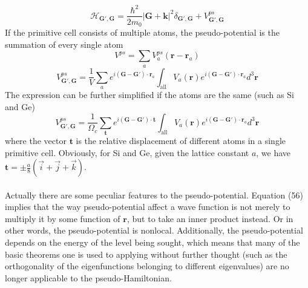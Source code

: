 \documentclass{article}
\begin{document}
\begin{equation}
   \mathcal{H}_{\mathbf{G}',\mathbf{G}}=\frac{\hbar^2}{2m_0}|\mathbf{G}+\mathbf{k}|^2\delta_{\mathbf{G}',\mathbf{G}}+V^{ps}_{\mathbf{G}',\mathbf{G}}
\end{equation}If the primitive cell consists of multiple atoms, the pseudo-potential is the summation of every single atom\begin{equation}
    V^{ps}=\sum_aV^{ps}_a(\mathbf{r}-\mathbf{r}_a)
\end{equation}\begin{equation}
    V^{ps}_{\mathbf{G}',\mathbf{G}}=\frac{1}{V}\sum_a{e^{i(\mathbf{G}-\mathbf{G}')\cdot\mathbf{r}_a}}\int_{\mathrm{all}}V_a(\mathbf{r})e^{i(\mathbf{G}-\mathbf{G}')\cdot\mathbf{r}_a}d^3\mathbf{r}
\end{equation}The expression can be further simplified if the atoms are the same (such as Si and Ge)\begin{equation}
    V^{ps}_{\mathbf{G}',\mathbf{G}}=\frac{1}{\Omega_c}\sum_{\mathbf{t}}{e^{i(\mathbf{G}-\mathbf{G}')\cdot\mathbf{t}}}\int_{\mathrm{all}}V_a(\mathbf{r})e^{i(\mathbf{G}-\mathbf{G}')\cdot\mathbf{r}_a}d^3\mathbf{r}
\end{equation}where the vector $\mathbf{t}$ is the relative displacement of different atoms in a single primitive cell. Obviously, for Si and Ge, given the lattice constant $a$, we have $\mathbf{t}=\pm\frac{a}{8}(\vec{i}+\vec{j}+\vec{k})$.\\
\\
Actually there are some peculiar features to the pseudo-potential. Equation (56) implies that the way pseudo-potential affect a wave function is not merely to multiply it by some function of $\mathbf{r}$, but to take an inner product instead. Or in other words, the pseudo-potential is nonlocal. Additionally, the pseudo-potential depends on the energy of the level being sought, which means that many of the basic theorems one is used to applying without further thought (such as the orthogonality of the eigenfunctions belonging to different eigenvalues) are no longer applicable to the pseudo-Hamiltonian.
\end{document}
